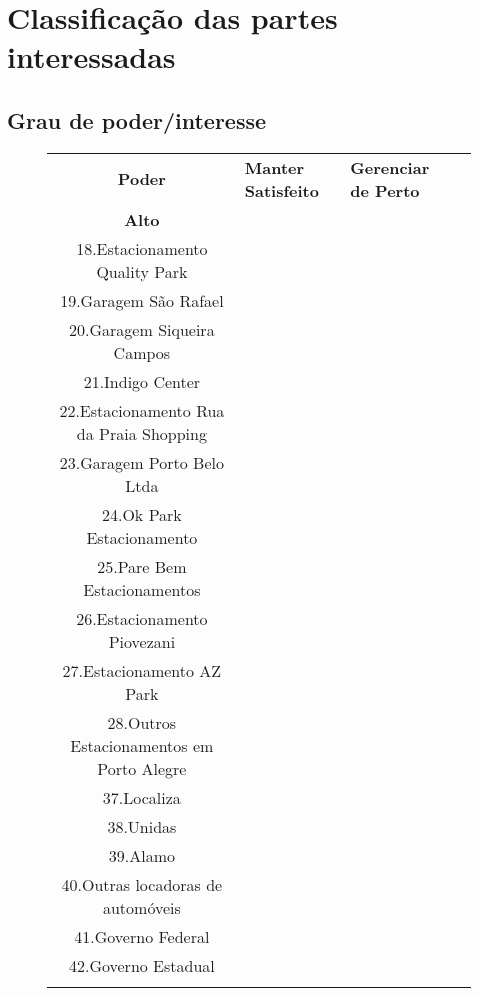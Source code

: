 \chapter{Classificação das partes interessadas}

\section{Grau de poder/interesse}
\label{sec:power-interest-grade}

\begin{figure}[h]
	\begin{tabularx}{\textwidth}{ c | >{\centering\arraybackslash}X  >{\centering\arraybackslash}X l}
		\textbf{Poder} & \cellcolor{blue!10!}\textbf{Manter Satisfeito} & \cellcolor{red!10!}\textbf{Gerenciar de Perto}  &                    \\
		\textbf{Alto} &
		\cellcolor{blue!10!}\begin{tabular}{@{}p{}@{}}
			17.Estafácil                             \\
			18.Estacionamento Quality Park            \\
			19.Garagem São Rafael                    \\
			20.Garagem Siqueira Campos                \\
			21.Indigo Center                          \\
			22.Estacionamento Rua da Praia Shopping   \\
			23.Garagem Porto Belo Ltda                \\
			24.Ok Park Estacionamento                 \\
			25.Pare Bem Estacionamentos               \\
			26.Estacionamento Piovezani               \\
			27.Estacionamento AZ Park                 \\
			28.Outros Estacionamentos em Porto Alegre \\
			37.Localiza                               \\
			38.Unidas                                 \\
			39.Alamo                                  \\
			40.Outras locadoras de automóveis        \\
			41.Governo Federal                        \\
			42.Governo Estadual                       \\

\end{tabular}
\end{tabularx}
\end{figure}
